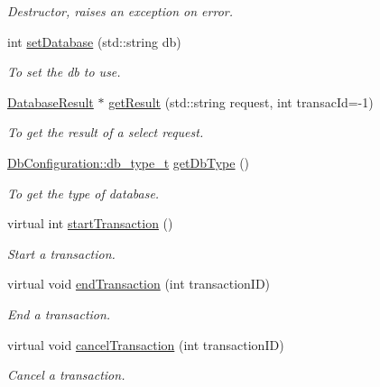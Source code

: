 \begin{DoxyCompactItemize}
\begin{DoxyCompactList}\small\item\em Destructor, raises an exception on error. \item\end{DoxyCompactList}\item 
int \hyperlink{classPOSTGREDatabase_acadff2a3649a40b323eb7711e0d705cf}{setDatabase} (std::string db)
\begin{DoxyCompactList}\small\item\em To set the db to use. \item\end{DoxyCompactList}\item 
\hyperlink{classDatabaseResult}{DatabaseResult} $\ast$ \hyperlink{classPOSTGREDatabase_ae2e9d1e4244c458abad565e00c38cb7a}{getResult} (std::string request, int transacId=-\/1)
\begin{DoxyCompactList}\small\item\em To get the result of a select request. \item\end{DoxyCompactList}\item 
\hyperlink{classDbConfiguration_a4a57e43a5017a5c4833a784a994c91cf}{DbConfiguration::db\_\-type\_\-t} \hyperlink{classPOSTGREDatabase_a6f446f99cff05695b37165ee0ce22a9a}{getDbType} ()
\begin{DoxyCompactList}\small\item\em To get the type of database. \item\end{DoxyCompactList}\item 
virtual int \hyperlink{classPOSTGREDatabase_a3257276f03c981dd6bb4b61d0cd0f863}{startTransaction} ()
\begin{DoxyCompactList}\small\item\em Start a transaction. \item\end{DoxyCompactList}\item 
virtual void \hyperlink{classPOSTGREDatabase_a5fb689587cff7610949dd8ae0c14a321}{endTransaction} (int transactionID)
\begin{DoxyCompactList}\small\item\em End a transaction. \item\end{DoxyCompactList}\item 
virtual void \hyperlink{classPOSTGREDatabase_af511e1e797dbd05dcb582d3f9603392f}{cancelTransaction} (int transactionID)
\begin{DoxyCompactList}\small\item\em Cancel a transaction. \item\end{DoxyCompactList}\item 

\end{DoxyCompactItemize}
